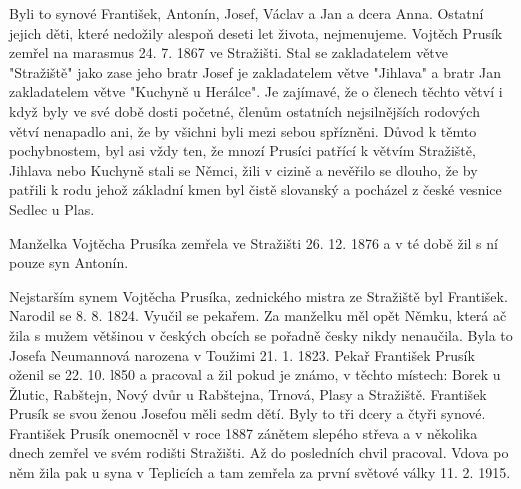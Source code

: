 \documentclass[../dejiny-rodu-prusiku.tex]{subfiles}
\begin{document}
Byli to synové František, Antonín, Josef, Václav a Jan a dcera Anna. Ostatní jejich děti, které nedožily alespoň deseti let života, nejmenujeme. Vojtěch Prusík zemřel na marasmus 24. 7. 1867 ve Stražišti. Stal se zakladatelem větve "Stražiště" jako zase jeho bratr Josef je zakladatelem větve "Jihlava" a bratr Jan zakladatelem větve "Kuchyně u Herálce". Je zajímavé, že o členech těchto větví i když byly ve své době dosti početné, členům ostatních nejsilnějších rodových větví nenapadlo ani, že by všichni by­li mezi sebou spřízněni. Důvod k těmto pochybnostem, byl asi vždy ten, že mnozí Prusíci patřící k větvím Stražiště, Jihlava nebo Kuchyně stali se Němci, žili v cizině a nevěřilo se dlouho, že by patřili k rodu jehož základní kmen byl čistě slovanský a pocházel z české vesnice Sedlec u Plas.

Manželka Vojtěcha Prusíka zemřela ve Stražišti 26. 12. 1876 a v té době žil s ní pouze syn Antonín.

Nejstarším synem Vojtěcha Prusíka, zednického mistra ze Stražiště byl František. Narodil se 8. 8. 1824. Vyučil se pekařem. Za manželku měl opět Němku, která ač žila s mužem většinou v českých obcích se pořadně česky nikdy nenaučila. Byla to Josefa Neumannová narozena v Toužimi 21. 1. 1823. Pekař František Prusík oženil se 22. 10. l850 a pracoval a žil pokud je známo, v těchto místech: Borek u Žlutic, Rabštejn, Nový dvůr u Rabštejna, Trnová, Plasy a Stražiště. František Prusík se svou ženou Josefou měli sedm dětí. Byly to tři dcery a čtyři synové. František Prusík onemocněl v roce 1887 zánětem slepého střeva a v několika dnech zemřel ve svém rodišti Stražišti. Až do posledních chvil pracoval. Vdova po něm žila pak u syna v Teplicích a tam zemřela za první světové války 11. 2. 1915.
\end{document}
